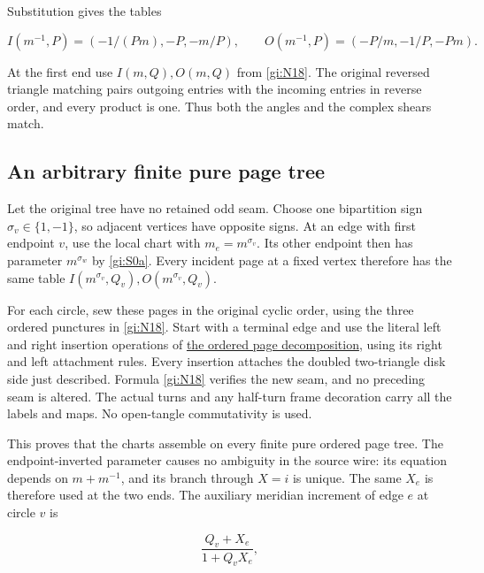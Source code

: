 Substitution gives the tables

\begin{equation}\label{gi:S0a}
I(m^{-1},P)=(-1/(Pm),-P,-m/P),\qquad
 O(m^{-1},P)=(-P/m,-1/P,-Pm).
\end{equation}

At the first end use \(I(m,Q),O(m,Q)\) from \eqref{gi:N18}.
The original reversed triangle matching pairs outgoing entries with
the incoming entries in reverse order, and every product is one.
Thus both the angles and the complex shears match.

\subsection{An arbitrary finite pure page tree}\label{gi:an-arbitrary-finite-pure-page-tree}

Let the original tree have no retained odd seam. Choose one
bipartition sign \(\sigma_v\in\{1,-1\}\), so adjacent
vertices have opposite signs. At an edge with first endpoint
\(v\), use the local chart with \(m_e=m^{\sigma_v}\).
Its other endpoint then has parameter \(m^{\sigma_w}\) by
\eqref{gi:S0a}. Every incident page at a fixed vertex therefore has the
same table \(I(m^{\sigma_v},Q_v),O(m^{\sigma_v},Q_v)\).

For each circle, sew these pages in the original cyclic order,
using the three ordered punctures in \eqref{gi:N18}. Start with a terminal
edge and use the literal left and right insertion operations of
\href{https://sashakolpakov.github.io/murakamis_dream/notes/actual_all_circle_octahedral_decomposition.html}{the ordered page decomposition},
using its right and left attachment rules. Every insertion attaches the doubled
two-triangle disk side just described. Formula \eqref{gi:N18} verifies the
new seam, and no preceding seam is altered. The actual turns
and any half-turn frame decoration carry all the labels and maps.
No open-tangle commutativity is used.

This proves that the charts assemble on every finite pure ordered
page tree. The endpoint-inverted parameter causes no ambiguity in
the source wire: its equation depends on \(m+m^{-1}\), and its
branch through \(X=i\) is unique. The same \(X_e\) is therefore
used at the two ends. The auxiliary meridian increment of edge
\(e\) at circle \(v\) is

\begin{equation}\label{gi:S5}
\frac{Q_v+X_e}{1+Q_vX_e},
\end{equation}

